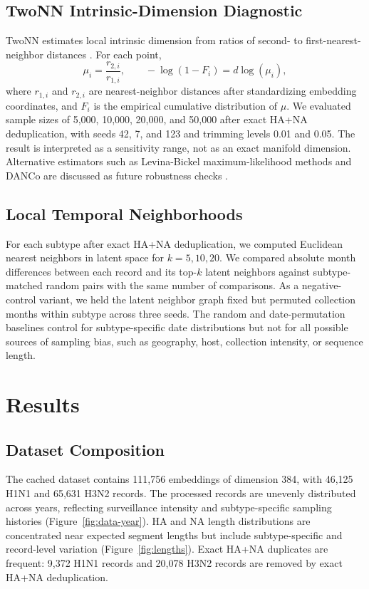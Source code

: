 \documentclass[11pt]{article}
\begin{document}
\subsection{TwoNN Intrinsic-Dimension Diagnostic}

TwoNN estimates local intrinsic dimension from ratios of second- to first-nearest-neighbor distances \cite{facco2017intrinsic}. For each point,
\[
\mu_i=\frac{r_{2,i}}{r_{1,i}},
\qquad
-\log(1-F_i)=d\log(\mu_i),
\]
where $r_{1,i}$ and $r_{2,i}$ are nearest-neighbor distances after standardizing embedding coordinates, and $F_i$ is the empirical cumulative distribution of $\mu$. We evaluated sample sizes of 5,000, 10,000, 20,000, and 50,000 after exact HA+NA deduplication, with seeds 42, 7, and 123 and trimming levels 0.01 and 0.05. The result is interpreted as a sensitivity range, not as an exact manifold dimension. Alternative estimators such as Levina-Bickel maximum-likelihood methods and DANCo are discussed as future robustness checks \cite{levina2005maximum,ceruti2014danco}.

\subsection{Local Temporal Neighborhoods}

For each subtype after exact HA+NA deduplication, we computed Euclidean nearest neighbors in latent space for $k=5,10,20$. We compared absolute month differences between each record and its top-$k$ latent neighbors against subtype-matched random pairs with the same number of comparisons. As a negative-control variant, we held the latent neighbor graph fixed but permuted collection months within subtype across three seeds. The random and date-permutation baselines control for subtype-specific date distributions but not for all possible sources of sampling bias, such as geography, host, collection intensity, or sequence length.

\section{Results}

\subsection{Dataset Composition}

The cached dataset contains 111,756 embeddings of dimension 384, with 46,125 H1N1 and 65,631 H3N2 records. The processed records are unevenly distributed across years, reflecting surveillance intensity and subtype-specific sampling histories (Figure~\ref{fig:data-year}). HA and NA length distributions are concentrated near expected segment lengths but include subtype-specific and record-level variation (Figure~\ref{fig:lengths}). Exact HA+NA duplicates are frequent: 9,372 H1N1 records and 20,078 H3N2 records are removed by exact HA+NA deduplication.
\end{document}
